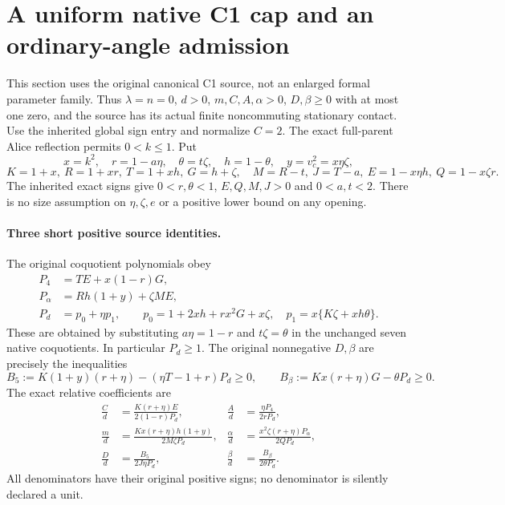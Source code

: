 \section[A uniform native C1 cap and an ordinary-angle admission]{A uniform native C1 cap and an ordinary-angle admission}
\label{sec:c1-global-native-cap}

This section uses the original canonical C1 source, not an enlarged
formal parameter family. Thus $\lambda=n=0$, $d>0$, $m,C,A,\alpha>0$,
$D,\beta\ge0$ with at most one zero, and the source has its actual
finite noncommuting stationary contact. Use the inherited global sign
entry and normalize $C=2$. The exact full-parent Alice reflection
permits $0<k\le1$. Put
\[
 x=k^2,\quad r=1-a\eta,\quad\theta=t\zeta,\quad
 h=1-\theta,\quad y=v_c^2=x\eta\zeta,
\]
\[
 K=1+x,\ R=1+xr,\ T=1+xh,\ G=h+\zeta,
 \quad M=R-t,\ J=T-a,\ E=1-x\eta h,\ Q=1-x\zeta r.
 \tag{NC1}
\]
The inherited exact signs give $0<r,\theta<1$, $E,Q,M,J>0$ and
$0<a,t<2$. There is no size assumption on $\eta,\zeta,e$ or a
positive lower bound on any opening.

\paragraph{Three short positive source identities.}
The original coquotient polynomials obey
\begin{align*}
 P_4&=TE+x(1-r)G,\\
 P_\alpha&=Rh(1+y)+\zeta ME,\\
 P_d&=p_0+\eta p_1,\qquad
 p_0=1+2xh+rx^2G+x\zeta,\quad
 p_1=x\{K\zeta+xh\theta\}.
 \tag{NC2}
\end{align*}
These are obtained by substituting $a\eta=1-r$ and $t\zeta=\theta$
in the unchanged seven native coquotients. In particular $P_d\ge1$.
The original nonnegative $D,\beta$ are precisely the inequalities
\[
 B_5:=K(1+y)(r+\eta)-(\eta T-1+r)P_d\ge0,
 \qquad B_\beta:=Kx(r+\eta)G-\theta P_d\ge0.
 \tag{NC3}
\]
The exact relative coefficients are
\begin{align*}
 \frac C d&=\frac{K(r+\eta)E}{2(1-r)P_d},&
 \frac A d&=\frac{\eta P_4}{2rP_d},\\
 \frac m d&=\frac{Kx(r+\eta)h(1+y)}{2M\zeta P_d},&
 \frac\alpha d&=\frac{x^2\zeta(r+\eta)P_\alpha}{2QP_d},\\
 \frac Dd&=\frac{B_5}{2J\eta P_d},&
 \frac\beta d&=\frac{B_\beta}{2\theta P_d}.
 \tag{NC4}
\end{align*}
All denominators have their original positive signs; no denominator is
silently declared a unit.

